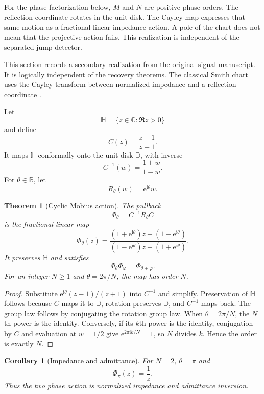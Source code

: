 \documentclass[11pt,letterpaper]{article}
\newtheorem{theorem}{Theorem}[section]
\theoremstyle{plain}
\theoremstyle{plain}
\theoremstyle{plain}
\newtheorem{corollary}[corollary]{Corollary}
\theoremstyle{definition}
\theoremstyle{definition}
\theoremstyle{definition}
\theoremstyle{definition}
\theoremstyle{remark}
\theoremstyle{remark}
\theoremstyle{remark}
\theoremstyle{remark}
\newcommand{\ii}{\mathrm i}
\newcommand{\CC}{\mathbb C}
\newcommand{\RR}{\mathbb R}
\newcommand{\e}{\mathrm e}
\begin{document}
\begin{interpretation}[title={Keep the rotation and its chart separate}]
For the phase factorization below, $M$ and $N$ are positive phase orders. The reflection coordinate rotates in the unit disk. The Cayley map expresses that same motion as a fractional linear impedance action. A pole of the chart does not mean that the projective action fails. This realization is independent of the separated jump detector.
\end{interpretation}

This section records a secondary realization from the original signal manuscript. It is logically independent of the recovery theorems. The classical Smith chart uses the Cayley transform between normalized impedance and a reflection coordinate \cite{Smith1969}.

Let
\[
\mathbb H
=
\{z\in\CC:\Re z>0\}
\]
and define
\[
C(z)=\frac{z-1}{z+1}.
\]
It maps \(\mathbb H\) conformally onto the unit disk \(\mathbb D\), with inverse
\[
C^{-1}(w)=\frac{1+w}{1-w}.
\]
For \(\theta\in\RR\), let
\[
R_\theta(w)=\e^{\ii\theta}w.
\]

\begin{theorem}[Cyclic Mobius action]\label{thm:cyclic_mobius}
The pullback
\[
\Phi_\theta
=C^{-1}R_\theta C
\]
is the fractional linear map
\[
\boxed{
\Phi_\theta(z)
=
\frac{(1+\e^{\ii\theta})z+(1-\e^{\ii\theta})}
{(1-\e^{\ii\theta})z+(1+\e^{\ii\theta})}.
}
\]
It preserves \(\mathbb H\) and satisfies
\[
\Phi_\theta\Phi_\varphi
=
\Phi_{\theta+\varphi}.
\]
For an integer \(N\geq1\) and \(\theta=2\pi/N\), the map has order \(N\).
\end{theorem}

\begin{proof}
Substitute \(\e^{\ii\theta}(z-1)/(z+1)\) into \(C^{-1}\) and simplify. Preservation of \(\mathbb H\) follows because \(C\) maps it to \(\mathbb D\), rotation preserves \(\mathbb D\), and \(C^{-1}\) maps back. The group law follows by conjugating the rotation group law. When \(\theta=2\pi/N\), the \(N\)th power is the identity. Conversely, if its \(k\)th power is the identity, conjugation by \(C\) and evaluation at \(w=1/2\) give \(\e^{2\pi\ii k/N}=1\), so \(N\) divides \(k\). Hence the order is exactly \(N\).
\end{proof}

\begin{corollary}[Impedance and admittance]\label{cor:impedance_admittance}
For \(N=2\), \(\theta=\pi\) and
\[
\Phi_\pi(z)=\frac1z.
\]
Thus the two phase action is normalized impedance and admittance inversion.
\end{corollary}
\end{document}
